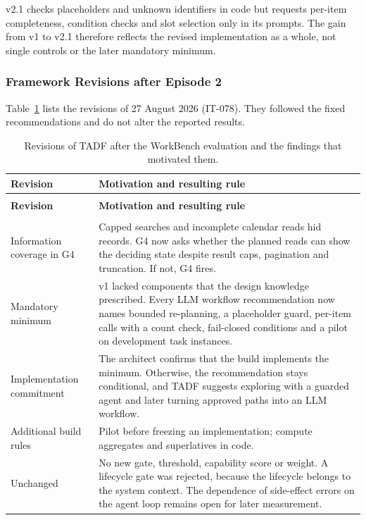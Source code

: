 v2.1 checks placeholders and unknown identifiers in code but requests per-item completeness, condition checks and slot selection only in its prompts. The gain from v1 to v2.1 therefore reflects the revised implementation as a whole, not single controls or the later mandatory minimum.

\subsubsection{Framework Revisions after Episode 2}
\label{app:eval2/framework-revision}
Table~\ref{tab:it078-changes} lists the revisions of 27 August 2026 (IT-078). They followed the fixed recommendations and do not alter the reported results.

\begingroup
\renewcommand{\baselinestretch}{1}
\small
\setlength{\tabcolsep}{4pt}
\renewcommand{\arraystretch}{1.08}
\begin{longtable}{>{\raggedright\arraybackslash}p{} >{\raggedright\arraybackslash}p{}}
\caption{Revisions of TADF after the WorkBench evaluation and the findings that motivated them.}\label{tab:it078-changes} \\
\toprule
\textbf{Revision} & \textbf{Motivation and resulting rule} \\
\midrule
\endfirsthead
\multicolumn{2}{l}{\tablename~\thetable{} (continued)} \\
\toprule
\textbf{Revision} & \textbf{Motivation and resulting rule} \\
\midrule
\endhead
\midrule
\multicolumn{2}{r}{\emph{Continued on the next page.}} \\
\endfoot
\bottomrule
\endlastfoot
Information coverage in G4 & Capped searches and incomplete calendar reads hid records. G4 now asks whether the planned reads can show the deciding state despite result caps, pagination and truncation. If not, G4 fires. \\
\addlinespace[2.5pt]
Mandatory minimum & v1 lacked components that the design knowledge prescribed. Every LLM workflow recommendation now names bounded re-planning, a placeholder guard, per-item calls with a count check, fail-closed conditions and a pilot on development task instances. \\
\addlinespace[2.5pt]
Implementation commitment & The architect confirms that the build implements the minimum. Otherwise, the recommendation stays conditional, and TADF suggests exploring with a guarded agent and later turning approved paths into an LLM workflow. \\
\addlinespace[2.5pt]
Additional build rules & Pilot before freezing an implementation; compute aggregates and superlatives in code. \\
\addlinespace[2.5pt]
Unchanged & No new gate, threshold, capability score or weight. A lifecycle gate was rejected, because the lifecycle belongs to the system context. The dependence of side-effect errors on the agent loop remains open for later measurement. \\
\end{longtable}
\endgroup

